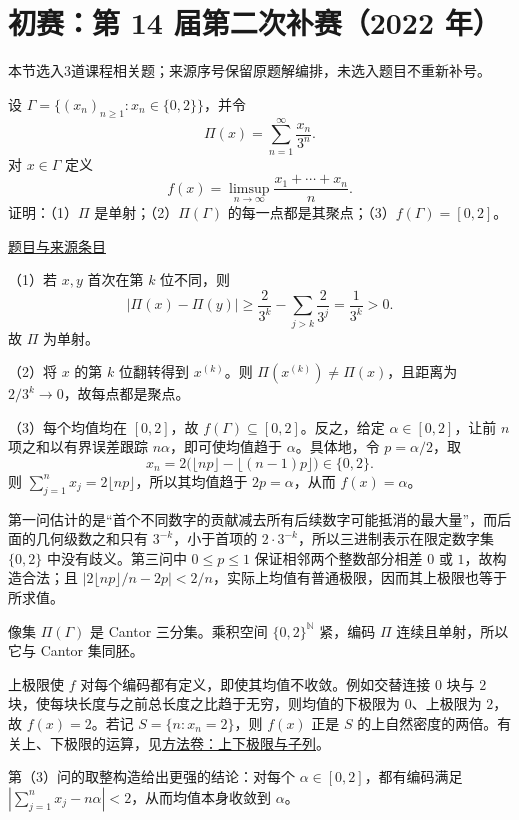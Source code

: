 \documentclass[UTF8,12pt,a4paper,fontset=fandol]{ctexart}
\begin{document}
\section{初赛：第 14 届第二次补赛（2022 年）}

本节选入3道课程相关题；来源序号保留原题解编排，未选入题目不重新补号。

\begin{example}[来源序号2]\label{ex:ch06-14th-A-makeup2:2}\label{pr:ch06-14th-A-makeup2:2}

设 $\Gamma=\{(x_n)_{n\geq1}:x_n\in\{0,2\}\}$，并令
\[
\Pi(x)=\sum_{n=1}^\infty\frac{x_n}{3^n}.
\]
对 $x\in\Gamma$ 定义
\[
f(x)=\limsup_{n\to\infty}\frac{x_1+\cdots+x_n}{n}.
\]
证明：（1）$\Pi$ 是单射；（2）$\Pi(\Gamma)$ 的每一点都是其聚点；（3）$f(\Gamma)=[0,2]$。

\par\href{https://github.com/lzxcr/cmc-mathematics/blob/64916fa1fdbc3e444a652eca204d5669058ee321/src/problems/preliminary/14-makeup2/02.md}{题目与来源条目}

\end{example}

\begin{solve}\label{ans:ch06-14th-A-makeup2:2}

（1）若 $x,y$ 首次在第 $k$ 位不同，则
\[
|\Pi(x)-\Pi(y)|\geq\frac2{3^k}-\sum_{j>k}\frac2{3^j}
=\frac1{3^k}>0.
\]
故 $\Pi$ 为单射。

（2）将 $x$ 的第 $k$ 位翻转得到 $x^{(k)}$。则 $\Pi(x^{(k)})\neq\Pi(x)$，且距离为 $2/3^k\to0$，故每点都是聚点。

（3）每个均值均在 $[0,2]$，故 $f(\Gamma)\subseteq[0,2]$。反之，给定 $\alpha\in[0,2]$，让前 $n$ 项之和以有界误差跟踪 $n\alpha$，即可使均值趋于 $\alpha$。具体地，令 $p=\alpha/2$，取
\[
x_n=2\bigl(\lfloor np\rfloor-\lfloor(n-1)p\rfloor\bigr)\in\{0,2\}.
\]
则 $\sum_{j=1}^n x_j=2\lfloor np\rfloor$，所以其均值趋于 $2p=\alpha$，从而 $f(x)=\alpha$。

第一问估计的是“首个不同数字的贡献减去所有后续数字可能抵消的最大量”，而后面的几何级数之和只有 $3^{-k}$，小于首项的 $2\cdot3^{-k}$，所以三进制表示在限定数字集 $\{0,2\}$ 中没有歧义。第三问中 $0\le p\le1$ 保证相邻两个整数部分相差 $0$ 或 $1$，故构造合法；且 $|2\lfloor np\rfloor/n-2p|<2/n$，实际上均值有普通极限，因而其上极限也等于所求值。

\end{solve}

\begin{remark}[方法与条件]像集 $\Pi(\Gamma)$ 是 Cantor 三分集。乘积空间 $\{0,2\}^{\mathbb N}$ 紧，编码 $\Pi$ 连续且单射，所以它与 Cantor 集同胚。

上极限使 $f$ 对每个编码都有定义，即使其均值不收敛。例如交替连接 $0$ 块与 $2$ 块，使每块长度与之前总长度之比趋于无穷，则均值的下极限为 $0$、上极限为 $2$，故 $f(x)=2$。若记 $S=\{n:x_n=2\}$，则 $f(x)$ 正是 $S$ 的上自然密度的两倍。有关上、下极限的运算，见\hyperref[app:limit-limsup]{方法卷：上下极限与子列}。

第（3）问的取整构造给出更强的结论：对每个 $\alpha\in[0,2]$，都有编码满足 $|\sum_{j=1}^n x_j-n\alpha|<2$，从而均值本身收敛到 $\alpha$。\end{remark}
\end{document}
